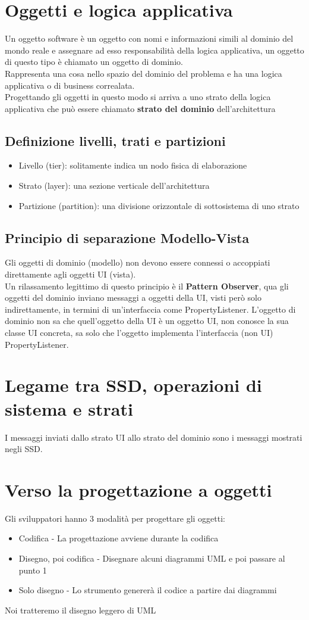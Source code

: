 \section{Oggetti e logica applicativa}
Un oggetto software è un oggetto con nomi e informazioni simili al dominio
del mondo reale e assegnare ad esso responsabilità della logica applicativa, un oggetto
di questo tipo è chiamato un oggetto di dominio.
\\ Rappresenta una cosa nello spazio del dominio del problema e ha una logica applicativa
o di business correalata.
\\ Progettando gli oggetti in questo modo si arriva a uno strato della logica
applicativa che può essere chiamato \textbf{strato del dominio} dell'architettura
\subsection{Definizione livelli, trati e partizioni}
\begin{itemize}
    \item Livello (tier): solitamente indica un nodo fisica di elaborazione 
    \item Strato (layer): una sezione verticale dell'architettura
    \item Partizione (partition): una divisione orizzontale di sottosistema di uno strato
\end{itemize}
\subsection{Principio di separazione Modello-Vista}
Gli oggetti di dominio (modello) non devono essere connessi o accoppiati direttamente agli
oggetti UI (vista).
\\ Un rilassamento legittimo di questo principio è il \textbf{Pattern Observer},
qua gli oggetti del dominio inviano messaggi a oggetti della UI, visti però solo
indirettamente, in termini di un'interfaccia come PropertyListener.
L'oggetto di dominio non sa che quell'oggetto della UI è un oggetto UI, non
conosce la sua classe UI concreta, sa solo che l'oggetto implementa l'interfaccia
(non UI) PropertyListener.
\section{Legame tra SSD, operazioni di sistema e strati}
I messaggi inviati dallo strato UI allo strato del dominio sono i messaggi mostrati
negli SSD.
\section{Verso la progettazione a oggetti}
Gli sviluppatori hanno 3 modalità per progettare gli oggetti:
\begin{itemize}
    \item Codifica - La progettazione avviene durante la codifica
    \item Disegno, poi codifica - Disegnare alcuni diagrammi UML e poi passare al punto 1
    \item Solo disegno - Lo strumento genererà il codice a partire dai diagrammi
\end{itemize}
Noi tratteremo il disegno leggero di UML
